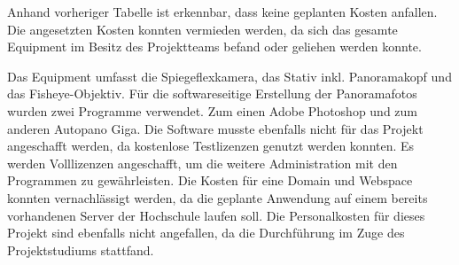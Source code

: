 

Anhand vorheriger Tabelle ist erkennbar, dass keine geplanten Kosten anfallen.
Die angesetzten Kosten konnten vermieden werden, da sich das gesamte Equipment im Besitz des Projektteams befand oder 
geliehen werden konnte.

Das Equipment umfasst die Spiegeflexkamera, das Stativ inkl. 
Panoramakopf und das Fisheye-Objektiv. Für die softwareseitige 
Erstellung der Panoramafotos wurden zwei Programme verwendet. Zum einen Adobe Photoshop und zum anderen Autopano Giga. 
Die Software musste ebenfalls nicht für das Projekt angeschafft werden, da kostenlose
Testlizenzen genutzt werden konnten. Es 
werden Volllizenzen angeschafft, um die weitere Administration mit den Programmen zu gewährleisten.
Die Kosten für eine Domain und Webspace konnten vernachlässigt werden, da die geplante Anwendung auf einem bereits 
vorhandenen Server der Hochschule laufen soll.
Die Personalkosten für dieses Projekt sind ebenfalls nicht angefallen, da die Durchführung im Zuge des Projektstudiums 
stattfand.